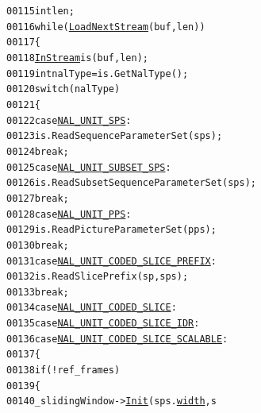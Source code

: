 \begin{footnotesize}
\begin{alltt}
00115                 \textcolor{keywordtype}{int} len;
00116                 \textcolor{keywordflow}{while} (\hyperlink{class_bitstream_data_a9475d45cccc6018ece6dec99caad1e58}{LoadNextStream}(buf, len))
00117                 \{
00118                         \hyperlink{class_in_stream}{InStream} is(buf, len);
00119                         \textcolor{keywordtype}{int} nalType = is.GetNalType();
00120                         \textcolor{keywordflow}{switch} (nalType)
00121                         \{
00122                         \textcolor{keywordflow}{case} \hyperlink{_consts4_standard_8h_a0ae628337fb17a2b11855dd3524f3d04a87cac3a362213e69d6c5b959471f6f98}{NAL_UNIT_SPS}:
00123                                 is.ReadSequenceParameterSet(sps);
00124                                 \textcolor{keywordflow}{break};
00125                         \textcolor{keywordflow}{case} \hyperlink{_consts4_standard_8h_a0ae628337fb17a2b11855dd3524f3d04ac483bd065332f7337e31c959e7034e6f}{NAL_UNIT_SUBSET_SPS}:
00126                                 is.ReadSubsetSequenceParameterSet(sps);
00127                                 \textcolor{keywordflow}{break};
00128                         \textcolor{keywordflow}{case} \hyperlink{_consts4_standard_8h_a0ae628337fb17a2b11855dd3524f3d04a0a937a1dcddd0ed49b7bbcc120a0a800}{NAL_UNIT_PPS}:
00129                                 is.ReadPictureParameterSet(pps);
00130                                 \textcolor{keywordflow}{break};
00131                         \textcolor{keywordflow}{case} \hyperlink{_consts4_standard_8h_a0ae628337fb17a2b11855dd3524f3d04a8c5dfdeb9a126add31b57b718eb32b46}{NAL_UNIT_CODED_SLICE_PREFIX}:
00132                                 is.ReadSlicePrefix(sp, sps);
00133                                 \textcolor{keywordflow}{break};
00134                         \textcolor{keywordflow}{case} \hyperlink{_consts4_standard_8h_a0ae628337fb17a2b11855dd3524f3d04a59e9c5af2da46fe7a2d51fa43ab26127}{NAL_UNIT_CODED_SLICE}:
00135                         \textcolor{keywordflow}{case} \hyperlink{_consts4_standard_8h_a0ae628337fb17a2b11855dd3524f3d04aa641b2e28c7c244e45e28f99dfc63a54}{NAL_UNIT_CODED_SLICE_IDR}:
00136                         \textcolor{keywordflow}{case} \hyperlink{_consts4_standard_8h_a0ae628337fb17a2b11855dd3524f3d04a693f7e481367a7aad4420eb441703e8b}{NAL_UNIT_CODED_SLICE_SCALABLE}:
00137                                 \{
00138                                         \textcolor{keywordflow}{if} (!ref\_frames)
00139                                         \{
00140                                                 \_slidingWindow->\hyperlink{class_sliding_window_ac71c1ed41e1b33a1ef3623c881e6d9d7}{Init}(sps.\hyperlink{struct_sequence_parameters_set_a72286e512a40a01670e2519b3971cee2}{width}, s

\end{alltt}
\end{footnotesize}
